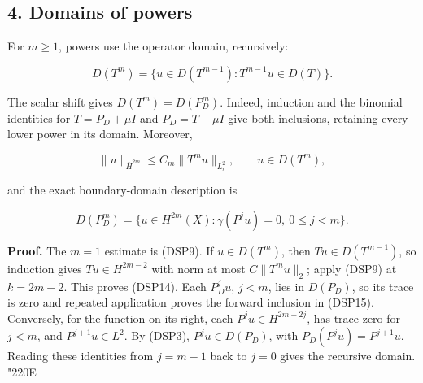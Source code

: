 \documentclass[
  11pt,
]{article}
\makeatletter
\let\ReaderOriginalAnchorStart\hyper@anchorstart
\let\ReaderOriginalAnchorEnd\hyper@anchorend
\let\ReaderPendingAliases\@empty
\def\ReaderArmAliases#1{\gdef\ReaderPendingAliases{#1}}
\def\hyper@anchorstart#1{\ReaderIfNativeAnchorTF{#1}{\ReaderPendingAliases\global\let\ReaderPendingAliases\@empty}{}\ReaderOriginalAnchorStart{#1}}
\makeatother
\begin{document}
\ReaderArmAliases{\ReaderOriginalAnchorStart{AN03-DSP-004}\ReaderOriginalAnchorEnd\begingroup\expandafter\def\csname @currentHref\endcsname{AN03-DSP-004}\label{AN03-DSP-004}\endgroup\ReaderOriginalAnchorStart{an03-dsp-004-domains-of-powers}\ReaderOriginalAnchorEnd\begingroup\expandafter\def\csname @currentHref\endcsname{an03-dsp-004-domains-of-powers}\label{an03-dsp-004-domains-of-powers}\endgroup\ReaderOriginalAnchorStart{4-domains-of-powers}\ReaderOriginalAnchorEnd\begingroup\expandafter\def\csname @currentHref\endcsname{4-domains-of-powers}\label{4-domains-of-powers}\endgroup\ReaderOriginalAnchorStart{domains-of-powers}\ReaderOriginalAnchorEnd}
\subsection{4. Domains of powers}\label{domains-of-powers}

For \(m\geq1\), powers use the operator domain, recursively:

\[
 D(T^m)=\{u\in D(T^{m-1}):T^{m-1}u\in D(T)\}.
\]

The scalar shift gives \(D(T^m)=D(P_D^m)\). Indeed, induction and the
binomial identities for \(T=P_D+\mu I\) and \(P_D=T-\mu I\) give both
inclusions, retaining every lower power in its domain. Moreover,

\[
 \|u\|_{\overline H^{2m}}\leq C_m\|T^mu\|_{L^2_r},\qquad u\in D(T^m),
 \tag{DSP14}
\]

and the exact boundary-domain description is

\[
 D(P_D^m)=\{u\in H^{2m}(X):\gamma(P^ju)=0,\ 0\leq j<m\}.
 \tag{DSP15}
\]

\textbf{Proof.} The \(m=1\) estimate is (DSP9). If \(u\in D(T^m)\), then
\(Tu\in D(T^{m-1})\), so induction gives \(Tu\in H^{2m-2}\) with norm at
most \(C\|T^mu\|_2\); apply (DSP9) at \(k=2m-2\). This proves (DSP14).
Each \(P_D^ju\), \(j<m\), lies in \(D(P_D)\), so its trace is zero and
repeated application proves the forward inclusion in (DSP15).
Conversely, for the function on its right, each \(P^ju\in H^{2m-2j}\),
has trace zero for \(j<m\), and \(P^{j+1}u\in L^2\). By (DSP3),
\(P^ju\in D(P_D)\), with \(P_D(P^ju)=P^{j+1}u\). Reading these
identities from \(j=m-1\) back to \(j=0\) gives the recursive domain. {\ReaderSymbols\char"220E}

\ReaderArmAliases{\ReaderOriginalAnchorStart{AN03-DSP-005}\ReaderOriginalAnchorEnd\begingroup\expandafter\def\csname @currentHref\endcsname{AN03-DSP-005}\label{AN03-DSP-005}\endgroup\ReaderOriginalAnchorStart{an03-dsp-005-compact-resolvent}\ReaderOriginalAnchorEnd\begingroup\expandafter\def\csname @currentHref\endcsname{an03-dsp-005-compact-resolvent}\label{an03-dsp-005-compact-resolvent}\endgroup\ReaderOriginalAnchorStart{5-compact-resolvent}\ReaderOriginalAnchorEnd\begingroup\expandafter\def\csname @currentHref\endcsname{5-compact-resolvent}\label{5-compact-resolvent}\endgroup\ReaderOriginalAnchorStart{compact-resolvent}\ReaderOriginalAnchorEnd}
\end{document}
